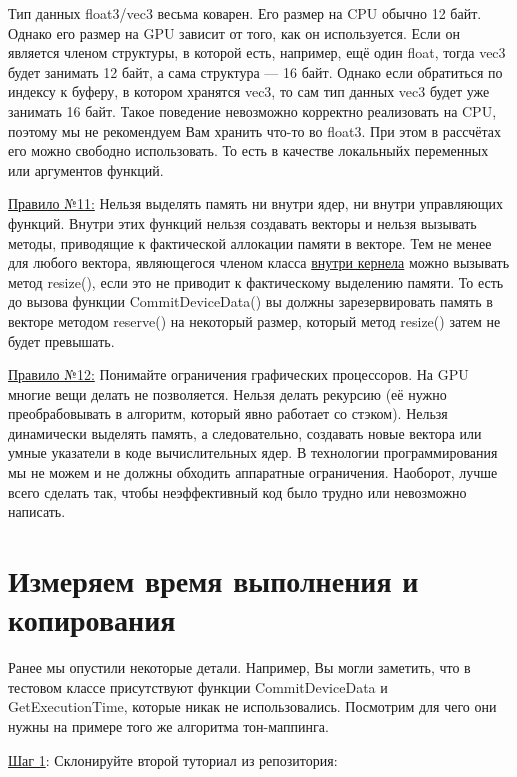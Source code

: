 \documentclass[11pt,fleqn,english,russian]{report} %
\begin{document}
\begin{remark}
Тип данных float3/vec3 весьма коварен. Его размер на CPU обычно 12 байт. Однако его размер на GPU зависит от того, как он используется. Если он является членом структуры, в которой есть, например, ещё один float, тогда vec3 будет занимать 12 байт, а сама структура --- 16 байт. Однако если обратиться по индексу к буферу, в котором хранятся vec3, то сам тип данных vec3 будет уже занимать 16 байт. Такое поведение невозможно корректно реализовать на CPU, поэтому мы не рекомендуем Вам хранить что-то во float3. При этом в рассчётах его можно свободно использовать. То есть в качестве локальныйх переменных или аргументов функций.
\end{remark}	

\underline{Правило №11:} Нельзя выделять память ни внутри ядер, ни внутри управляющих функций. Внутри этих функций нельзя создавать векторы и нельзя вызывать методы, приводящие к фактической аллокации памяти в векторе. Тем не менее для любого вектора, являющегося членом класса \underline{внутри кернела} можно вызывать метод resize(), если это не приводит к фактическому выделению памяти. То есть до вызова функции CommitDeviceData() вы должны зарезервировать память в векторе методом reserve() на некоторый размер, который метод resize() затем не будет превышать.

\underline{Правило №12:} Понимайте ограничения графических процессоров. На GPU многие вещи делать не позволяется. Нельзя делать рекурсию (её нужно преобрабовывать в алгоритм, который явно работает со стэком). Нельзя динамически выделять память, а следовательно, создавать новые вектора или умные указатели в коде вычислительных ядер. В технологии программирования мы не можем и не должны обходить аппаратные ограничения. Наоборот, лучше всего сделать так, чтобы неэффективный код было трудно или невозможно написать.

\section{Измеряем время выполнения и копирования}

Ранее мы опустили некоторые детали. Например, Вы могли заметить, что в тестовом классе присутствуют функции CommitDeviceData и GetExecutionTime, которые никак не использовались. Посмотрим для чего они нужны на примере того же алгоритма тон-маппинга.

\noindent\underline{Шаг 1}: Склонируйте второй туториал из репозитория:
\end{document}
